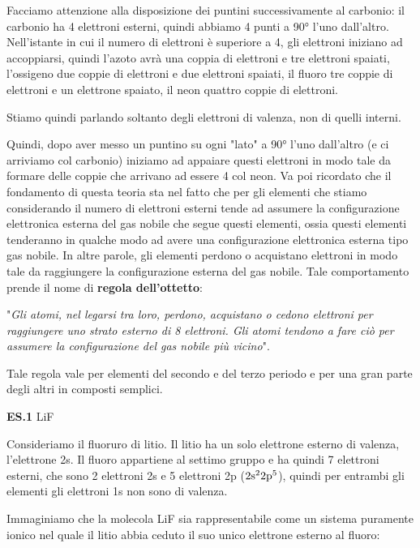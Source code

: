 \vspace{0.2cm}Facciamo attenzione alla disposizione dei puntini successivamente al carbonio: il carbonio ha 4 elettroni esterni, quindi abbiamo 4 punti a 90° l'uno dall'altro. Nell'istante in cui il numero di elettroni è superiore a 4, gli elettroni iniziano ad accoppiarsi, quindi l'azoto avrà una coppia di elettroni e tre elettroni spaiati, l'ossigeno due coppie di elettroni e due elettroni spaiati, il fluoro tre coppie di elettroni e un elettrone spaiato, il neon quattro coppie di elettroni.

Stiamo quindi parlando soltanto degli elettroni di valenza, non di quelli interni.

Quindi, dopo aver messo un puntino su ogni "lato" a 90° l'uno dall'altro (e ci arriviamo col carbonio) iniziamo ad appaiare questi elettroni in modo tale da formare delle coppie che arrivano ad essere 4 col neon. Va poi ricordato che il fondamento di questa teoria sta nel fatto che per gli elementi che stiamo considerando il numero di elettroni esterni tende ad assumere la configurazione elettronica esterna del gas nobile che segue questi elementi, ossia questi elementi tenderanno in qualche modo ad avere una configurazione elettronica esterna tipo gas nobile. In altre parole, gli elementi perdono o acquistano elettroni in modo tale da raggiungere la configurazione esterna del gas nobile. Tale comportamento prende il nome di \textbf{regola dell'ottetto}:

\vspace{0.2cm}"\textit{Gli atomi, nel legarsi tra loro, perdono, acquistano o cedono elettroni per raggiungere uno strato esterno di 8 elettroni. Gli atomi tendono a fare ciò per assumere la configurazione del gas nobile più vicino}". 

\vspace{0.2cm}Tale regola vale per elementi del secondo e del terzo periodo e per una gran parte degli altri in composti semplici.

\vspace{0.2cm}\textbf{ES.1} LiF

Consideriamo il fluoruro di litio. Il litio ha un solo elettrone esterno di valenza, l'elettrone 2s. Il fluoro appartiene al settimo gruppo e ha quindi 7 elettroni esterni, che sono 2 elettroni 2s e 5 elettroni 2p ($\rm 2s^22p^5$), quindi per entrambi gli elementi gli elettroni 1s non sono di valenza.

Immaginiamo che la molecola LiF sia rappresentabile come un sistema puramente ionico nel quale il litio abbia ceduto il suo unico elettrone esterno al fluoro:

